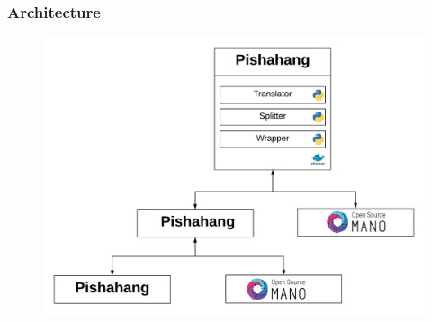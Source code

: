 
\begin{frame}
\frametitle{Architecture}


\begin{figure}
	\centering
	\includegraphics[width=0.8\linewidth]{images/plugin}
	\label{fig:plugin}
\end{figure}


\end{frame}


